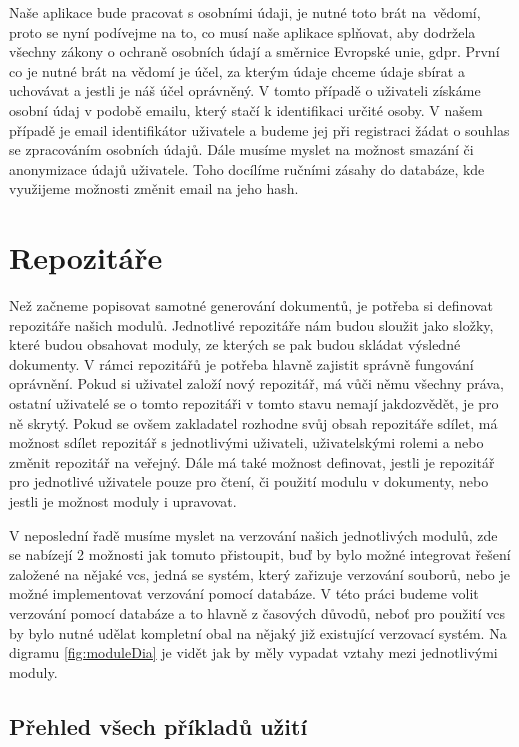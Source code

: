Naše aplikace bude pracovat s osobními údaji, je nutné toto brát na~vědomí, proto se nyní podívejme na to, co musí naše aplikace splňovat, aby dodržela všechny
zákony o ochraně osobních údají a směrnice Evropské unie, \gls{gdpr}. První co je nutné brát na vědomí je účel, za kterým údaje chceme údaje sbírat a uchovávat a jestli je náš
účel oprávněný. V tomto případě o uživateli získáme osobní údaj v podobě emailu, který stačí k identifikaci určité osoby. V našem případě je email identifikátor uživatele
a budeme jej při registraci žádat o souhlas se zpracováním osobních údajů. Dále musíme myslet na možnost smazání či anonymizace údajů uživatele. Toho docílíme ručními
zásahy do databáze, kde využijeme možnosti změnit email na jeho hash. \cite{gdpr}

\section{Repozitáře}

Než začneme popisovat samotné generování dokumentů, je potřeba si \mbox{definovat} repozitáře našich modulů. Jednotlivé repozitáře nám budou sloužit jako složky,
které budou obsahovat moduly, ze kterých se pak budou skládat výsledné dokumenty. V rámci repozitářů je potřeba hlavně zajistit správně fungování oprávnění.
Pokud si uživatel založí nový repozitář, má vůči němu všechny práva, ostatní uživatelé se o tomto repozitáři v tomto stavu nemají jak\linebreak dozvědět, je pro ně
skrytý. Pokud se ovšem zakladatel rozhodne svůj obsah repozitáře sdílet, má možnost sdílet repozitář s jednotlivými uživateli, uživatelskými rolemi a nebo
změnit repozitář na veřejný. Dále má také možnost definovat, jestli je repozitář pro jednotlivé uživatele pouze pro čtení, či použití modulu v dokumenty,
nebo jestli je možnost moduly i upravovat.

V neposlední řadě musíme myslet na verzování našich jednotlivých modulů, zde se nabízejí 2 možnosti jak tomuto přistoupit, buď by bylo možné integrovat
řešení založené na nějaké \gls{vcs}, jedná se systém, který zařizuje verzování souborů,
nebo je možné implementovat verzování pomocí databáze. V této práci budeme volit verzování pomocí databáze a to hlavně z časových důvodů, neboť
pro použití vcs by bylo nutné udělat kompletní obal na nějaký již existující verzovací systém. Na digramu \ref{fig:moduleDia} je vidět jak by měly
vypadat vztahy mezi jednotlivými moduly.
\subsection{Přehled všech příkladů užití}

